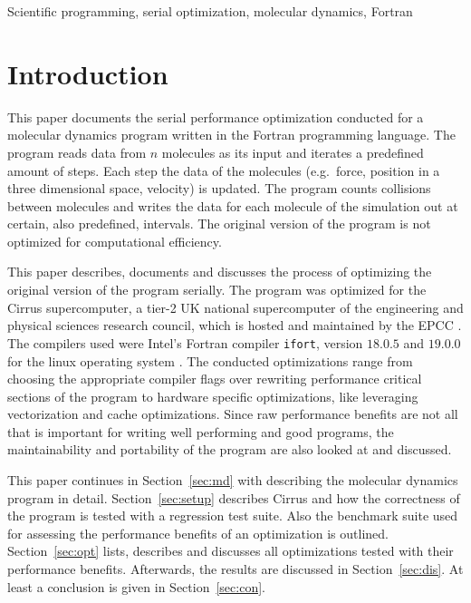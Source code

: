 \documentclass[twoside,11pt]{article}
\title{\titl}
\author{}
\begin{document}
\maketitle

\begin{abstract}
\end{abstract}

\begin{keywords}
Scientific programming, serial optimization, molecular dynamics,
Fortran
\end{keywords}

\section{Introduction} %

This paper documents the serial performance optimization conducted for
a molecular dynamics program written in the Fortran programming
language.
The program reads data from $n$ molecules as its input and iterates
a predefined amount of steps.
Each step the data of the molecules (e.g.\ force, position in a three
dimensional space, velocity) is updated.
The program counts collisions between molecules and writes the
data for each molecule of the simulation out at certain, also
predefined, intervals.
The original version of the program is not optimized for computational
efficiency.

This paper describes, documents and discusses the process of
optimizing the original version of the program serially.
The program was optimized for the Cirrus supercomputer, a tier-2
UK national supercomputer of the engineering and physical sciences
research council, which is hosted and maintained by the EPCC
\citep{cirrus}.
The compilers used were Intel's Fortran compiler \texttt{ifort},
version $18.0.5$ and $19.0.0$ for the linux operating system
\citep{ifort18, ifort19}.
The conducted optimizations range from choosing the appropriate
compiler flags over rewriting performance critical sections of the
program to hardware specific optimizations, like leveraging
vectorization and cache optimizations.
Since raw performance benefits are not all that is important for
writing well performing and good programs, the maintainability and
portability of the program are also looked at and discussed.


This paper continues in Section~\ref{sec:md} with describing the
molecular dynamics program in detail.
Section~\ref{sec:setup} describes Cirrus and how the correctness of
the program is tested with a regression test suite.
Also the benchmark suite used for assessing the performance benefits
of an optimization is outlined.
Section~\ref{sec:opt} lists, describes and discusses all
optimizations tested with their performance benefits.
Afterwards, the results are discussed in Section~\ref{sec:dis}.
At least a conclusion is given in Section~\ref{sec:con}.
\end{document}
